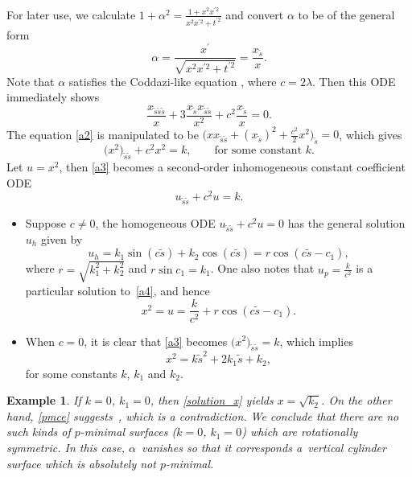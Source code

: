 \documentclass[pdftex]{sigma}
\numberwithin{equation}{section}
\newtheorem{Example}[Theorem]{Example}
\begin{document}
For later use, we calculate $1+\alpha^2=\frac{1+x^2x^{\prime 2}}{x^2x^{\prime 2}+t^{\prime 2}}$ and convert $\alpha$ to be of the general form
\begin{equation} \label{a1}
\alpha=\frac{x^{\prime }}{\sqrt{x^2x^{\prime 2}+t^{\prime 2}}}=\frac{
x_{\tilde s}}{x}.
\end{equation}
Note that $\alpha$ satisfies the Coddazi-like equation , where $c=2\lambda$. Then this ODE immediately shows
\begin{equation} \label{a2}
\frac{x_{\tilde s\tilde s\tilde s}}{x}+3\frac{x_{\tilde s}x_{\tilde s\tilde
s}}{x^2}+c^2\frac{x_{\tilde s}}{x}=0.
\end{equation}
The equation \eqref{a2} is manipulated to be
$
\bigl(xx_{\tilde s\tilde s}+(x_{\tilde s})^2+\frac{c^2}{2}x^2\bigr)_{\tilde s}=0$,
which gives
\begin{equation} \label{a3}
\big(x^2\big)_{\tilde s\tilde s}+c^2x^2=k,\qquad \mbox{for some constant $k$.}
\end{equation}
Let $u=x^2$, then \eqref{a3} becomes a second-order inhomogeneous constant
coefficient ODE
\begin{equation} \label{a4}
u_{\tilde s\tilde s}+c^2u=k.
\end{equation}
\begin{itemize}\itemsep=0pt
\item[(I)] Suppose $c\neq 0$, the homogeneous ODE $u_{\tilde s\tilde s}+c^2u=0$ has the
general solution $u_h$ given by
\begin{equation}\label{rk1}
u_h=k_1\sin(c\tilde s)+k_2\cos(c\tilde s)=r\cos(c\tilde s-c_1),
\end{equation}
where $r=\sqrt{k_1^2+k_2^2}$ and $r\sin c_1=k_1$. One also notes that $u_p=%
\frac{k}{c^2}$ is a particular solution to~\eqref{a4}, and hence
\begin{equation} \label{solution_u}
x^2=u=\frac{k}{c^2}+r\cos(c\tilde s-c_1).
\end{equation}

\item[(II)] When $c=0$, it is clear that \eqref{a3} becomes $\big(x^2\big)_{\tilde s\tilde s}=k$, which implies
\begin{equation}\label{solution_x}
x^2=k\tilde s^2+2k_1\tilde s+k_2,
\end{equation}
for some constants $k$, $k_{1}$ and $k_{2}$.
\end{itemize}
\begin{Example}
If $k=0$, $k_{1}=0$, then \eqref{solution_x} yields $x=\sqrt{k_2}$. On
the other hand, \eqref{pmce} suggests~,
which is a contradiction. We conclude that there are no such kinds of $p$-minimal surfaces ($k=0$, $k_{1}=0$) which are rotationally symmetric. In this case, $\alpha$~vanishes so that it corresponds a~vertical cylinder surface which is absolutely not $p$-minimal.
\end{Example}
\end{document}
